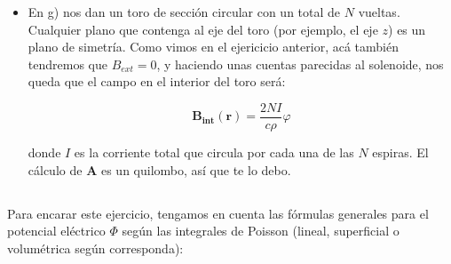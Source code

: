 \begin{itemize}
    $$B_{int}(\rho_{1})= \frac{4\pi nI}{c}$$

    Para hallar el potencial vector $\mathbf{A}$, supongamos que el solenoide es de secci\'on circular. Dada la simetr\'ia de rotaci\'on y traslaci\'on, tenemos que

    $$\mathbf{A(r)} = A_{\rho}(\rho)\hat{\rho} + A_{\varphi}(\rho)\hat{\varphi}$$

    Debido a que el solenoide es circular, nos aseguramos que la distribuci\'on de corriente es antisim\'etrica respecto de cualquier plano que contenga al eje $z$, por lo tanto $A_{z} = A_{\rho} = 0$. Entonces,

    $$\mathbf{A(r)} = A(\rho)\hat{\varphi}$$

    $$\Rightarrow \mathbf{B} = \nabla \times \mathbf{A} = \frac{1}{\rho}\frac{\partial}{\partial \rho}(\rho A(\rho))\hat{z}$$

    $$\Rightarrow B(\rho) = \frac{4\pi nI}{c} = \frac{1}{\rho}\frac{\partial}{\partial \rho}(\rho A(\rho))$$ si $\rho < a$

    Integrando:

    \[A(\rho)= \frac{1}{\rho} \int_{0}^{\rho} d\rho' \rho' B(\rho') = \frac{4\pi nI}{c}
        \begin{cases}
            \frac{\rho}{2}  & \rho < a\\
            \frac{a^{2}}{2\rho}  & \rho \geq a
        \end{cases}
    \]

    \item En g) nos dan un toro de secci\'on circular con un total de $N$ vueltas. Cualquier plano que contenga al eje del toro (por ejemplo, el eje $z$) es un plano de simetr\'ia. Como vimos en el ejericicio anterior, ac\'a tambi\'en tendremos que $B_{ext} = 0$, y haciendo unas cuentas parecidas al solenoide, nos queda que el campo en el interior del toro ser\'a:

    $$\mathbf{B_{int}(r)} = \frac{2NI}{c\rho}\hat{\varphi}$$

    donde $I$ es la corriente total que circula por cada una de las $N$ espiras. El c\'alculo de $\mathbf{A}$ es un quilombo, as\'i que te lo debo.

\end{itemize}

\subsection{}

Para encarar este ejercicio, tengamos en cuenta las f\'ormulas generales para el potencial el\'ectrico $\Phi$ seg\'un las integrales de Poisson (lineal, superficial o volum\'etrica seg\'un corresponda):

